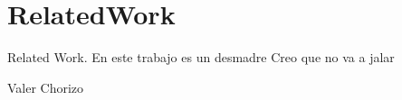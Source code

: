 \section{RelatedWork}

Related Work. En este trabajo es un desmadre Creo que no va a jalar

Valer Chorizo


